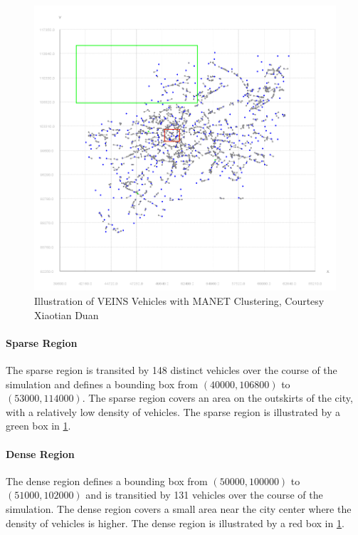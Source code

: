 \documentclass{thesis}
\begin{document}
    \begin{figure}
        \centering
        \includegraphics[scale=.5]{binImages/sparse-and-dense-clusters.png}
        \caption{Illustration of VEINS Vehicles with MANET Clustering, Courtesy Xiaotian Duan}
        \label{fig:regions}
    \end{figure}
    \paragraph{Sparse Region}
        The sparse region is transited by 148 distinct vehicles over the course of the simulation and defines a bounding
        box from $(40000, 106800)$ to $(53000, 114000)$. The sparse region covers an area on the outskirts of the city,
        with a relatively low density of vehicles. The sparse region is illustrated by a green box in \ref{fig:regions}.
    \paragraph{Dense Region}
        The dense region defines a bounding box from $(50000, 100000)$ to $(51000, 102000)$ and is transitied by
        131 vehicles over the course of the simulation. The dense region covers a small area near the city center
        where the density of vehicles is higher. The dense region is illustrated by a red box in \ref{fig:regions}.
\end{document}
